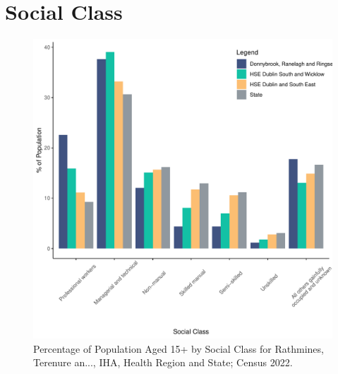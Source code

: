 \documentclass{article}
\begin{document}
\section{Social Class}\label{sect:SC}
\begin{figure}[H]
	\centering
	\includegraphics[width = 140mm]{../figures/SocialClassED.pdf}
	\caption{Percentage of Population Aged 15+ by Social Class for Rathmines, Terenure an..., IHA, Health Region and State; Census 2022.}
	\label{fig:vbnv}
	\end{figure}
\end{document}
